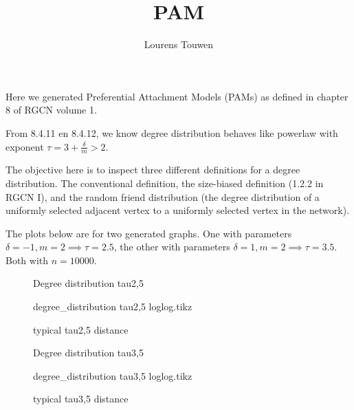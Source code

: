 \documentclass[fleqn]{article}
\title{PAM}
\author{Lourens Touwen}
\begin{document}
	
	\pagestyle{plain}
	
	\maketitle
	
	\newlength\fheight 
	\newlength\fwidth 
	\setlength{} 
	\setlength{}
	
	
	Here we generated Preferential Attachment Models (PAMs) as defined in chapter 8 of RGCN volume 1. 
	
	From 8.4.11 en 8.4.12, we know degree distribution behaves like powerlaw with exponent $\tau = 3 + \frac{\delta}{m} > 2$.
	
	The objective here is to inspect three different definitions for a degree distribution. The conventional definition, the size-biased definition (1.2.2 in RGCN I), and the random friend distribution (the degree distribution of a uniformly selected adjacent vertex to a uniformly selected vertex in the network).
	
	The plots below are for two generated graphs. One with parameters $\delta= -1, m = 2 \implies \tau = 2.5$, the other with parameters $\delta = 1, m = 2 \implies \tau = 3.5$. Both with $n = 10000$. 
	
	\begin{figure}[!htb]
		\centering
		
		\caption{Degree distribution tau2,5}
	\end{figure}
	
	\begin{figure}[!htb]
		\centering
		
		\caption{degree\_distribution tau2,5 loglog.tikz}
	\end{figure}

	\begin{figure}[!htb]
		\centering
		
		\caption{typical tau2,5 distance}
	\end{figure}

	\begin{figure}[!htb]
		\centering
		
		\caption{Degree distribution tau3,5}
	\end{figure}
	
	\begin{figure}[!htb]
		\centering
		
		\caption{degree\_distribution tau3,5 loglog.tikz}
	\end{figure}
	
	\begin{figure}[!htb]
		\centering
		
		\caption{typical tau3,5 distance}
	\end{figure}
\end{document}

